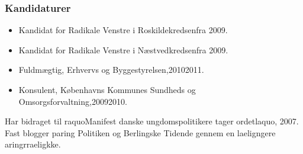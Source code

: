 \documentclass[11pt, a4paper]{awesome-cv}
\begin{document}
\begin{cvletter}
\subsubsection*{Kandidaturer}
\begin{itemize}
\item Kandidat for Radikale Venstre i Roskildekredsenfra 2009.
\item Kandidat for Radikale Venstre i Næstvedkredsenfra 2009.
\end{itemize}
\begin{itemize}
\item Fuldmægtig, Erhvervs og Byggestyrelsen,20102011.
\item Konsulent, Københavns Kommunes Sundheds og Omsorgsforvaltning,20092010.
\end{itemize}
Har bidraget til raquoManifest  danske ungdomspolitikere tager ordetlaquo, 2007. Fast blogger paring Politiken og Berlingske Tidende gennem en laeligngere aringrraeligkke.

\end{cvletter}
\end{document}
